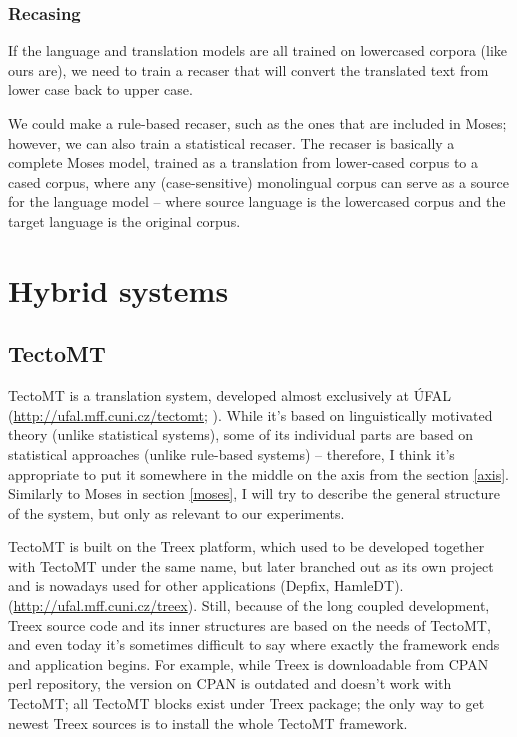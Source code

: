 \subsubsection{Recasing}
If the language and translation models are all trained on lowercased corpora (like ours are), we need to train a recaser that will convert the translated text from lower case back to upper case.

We could make a rule-based recaser, such as the ones that are included in Moses; however, we can also train a statistical recaser. 
The recaser is basically a complete Moses model, trained as a translation from lower-cased corpus to a cased corpus, where any (case-sensitive) monolingual corpus can serve as a source for the language model -- where source language is the lowercased corpus and the target language is the original corpus. 

\section{Hybrid systems}
\subsection{TectoMT}
\label{tecto}
TectoMT is a translation system, developed almost exclusively at ÚFAL (\url{http://ufal.mff.cuni.cz/tectomt}; \cite{tmt_desc}). 
While it's based on linguistically motivated theory (unlike  statistical systems), some of its individual parts are based on statistical approaches (unlike  rule-based systems) -- therefore, I think it's appropriate to put it somewhere in the middle on the axis from the section \ref{axis}. Similarly to Moses in section \ref{moses}, I will try to describe the general structure of the system, but only as relevant to our experiments.

TectoMT is built on the Treex platform, which used to be developed together with TectoMT under the same name, but later branched out as its own project and is nowadays used for other applications (Depfix, HamleDT). (\url{http://ufal.mff.cuni.cz/treex}). 
Still, because of the long coupled development, Treex source code and its inner structures are based on the needs of TectoMT, and even today it's sometimes difficult to say where exactly the framework ends and application begins. For example, while Treex is downloadable from CPAN perl repository, the version on CPAN is outdated and doesn't work with TectoMT; all TectoMT blocks exist under Treex package; the only way to get newest Treex sources is to install the whole TectoMT framework.

